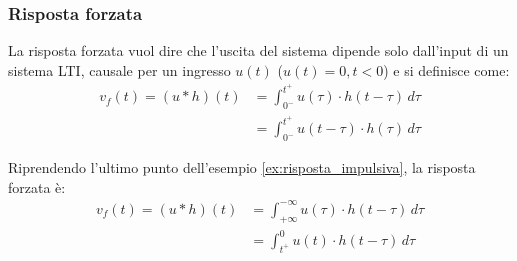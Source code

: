 \documentclass[a4paper]{article}
\begin{document}
\subsubsection{Risposta forzata}
\begin{definition}
  La risposta forzata vuol dire che l'uscita del sistema dipende solo dall'input di un
  sistema LTI, causale per un ingresso \( u(t) \) (\( u(t) = 0, t < 0 \)) e si definisce
  come:
  \[
    \begin{aligned}
      v_f(t) = (u \ast h)(t) &= \int_{0^-}^{t^+} u(\tau) \cdot h(t-\tau) \, d\tau\\
                             &= \int_{0^-}^{t^+} u(t-\tau) \cdot h(\tau) \, d\tau
    \end{aligned}
  \] 
\end{definition}

\begin{example}
  Riprendendo l'ultimo punto dell'esempio \ref{ex:risposta_impulsiva}, la risposta
  forzata è:
  \[
    \begin{aligned}
      v_f(t) = (u \ast h)(t) &= \int_{+\infty}^{-\infty} u(\tau) \cdot h(t-\tau) \, d\tau\\
                             &= \int_{t^+}^{0} u(t) \cdot h(t-\tau) \, d\tau
    \end{aligned}
  \] 
\end{example}
\end{document}
